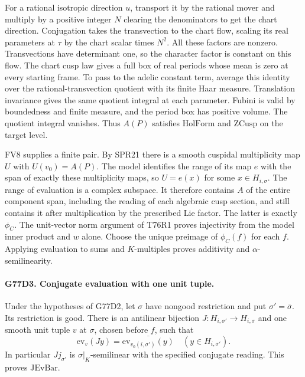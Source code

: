 For a rational isotropic direction $u$, transport it by the rational
mover and multiply by a positive integer $N$ clearing the
denominators to get the chart direction. Conjugation takes the
transvection to the chart flow, scaling its real parameters at
$\tau$ by the chart scalar times $N^2$. All these factors are
nonzero. Transvections have determinant one, so the character
factor is constant on this flow. The chart cusp law gives a full
box of real periods whose mean is zero at every starting frame.
To pass to the adelic constant term, average this identity over
the rational-transvection quotient with its finite Haar measure.
Translation invariance gives the same quotient integral at each
parameter. Fubini is valid by boundedness and finite measure, and
the period box has positive volume. The quotient integral vanishes.
Thus $A(P)$ satisfies $\mathrm{HolForm}$ and $\mathrm{ZCusp}$
on the target level.

FV8 supplies a finite pair. By SPR21 there is a smooth cuspidal
multiplicity map $U$ with $U(v_0)=A(P)$. The model identifies the
range of its map $e$ with the span of exactly these multiplicity
maps, so $U=e(x)$ for some $x\in H_{i,\sigma}$. The range of
evaluation is a complex subspace. It therefore contains $A$ of
the entire component span, including the reading of each algebraic
cusp section, and still contains it after multiplication by the
prescribed Lie factor. The latter is exactly $\phi_C$. The
unit-vector norm argument of T76R1 proves injectivity from the
model inner product and $w$ alone. Choose the unique preimage of
$\phi_C(f)$ for each $f$. Applying evaluation to sums and
$K$-multiples proves additivity and $\alpha$-semilinearity.

\paragraph{G77D3. Conjugate evaluation with one unit tuple.}
Under the hypotheses of G77D2, let $\sigma$ have nongood
restriction and put $\sigma'=\overline\sigma$. Its restriction
is good. There is an antilinear bijection
$J:H_{i,\sigma'}\to H_{i,\sigma}$ and one smooth unit tuple $v$
at $\sigma$, chosen before $f$, such that
\[
 \mathrm{ev}_{v}(Jy)=\overline{\mathrm{ev}_{v_0(i,\sigma')}(y)}
 \quad(y\in H_{i,\sigma'}).
\]
In particular $Jj_{\sigma'}$ is $\sigma|_K$-semilinear with the
specified conjugate reading. This proves $\mathrm{JEvBar}$.

